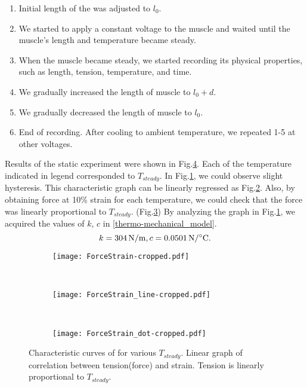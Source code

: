 \begin{enumerate}
\item Initial length of the \scp was adjusted to $l_0$.
\item We started to apply a constant voltage to the muscle and waited until the muscle's length and temperature became steady.
\item When the muscle became steady, we started recording its physical properties, such as length, tension, temperature, and time.
\item We gradually increased the length of muscle to $l_0+d$.
\item We gradually decreased the length of muscle to $l_0$.
\item End of recording. After cooling to ambient temperature, we repeated 1-5 at other voltages.
\end{enumerate}

Results of the static experiment were shown in Fig.\ref{static1_results}. Each of the temperature indicated in legend corresponded to $T_{steady}$. In Fig.\ref{static1_result}, we could observe slight hysteresis. This characteristic graph can be linearly regressed as Fig.\ref{static1_line}. Also, by obtaining force at 10\% strain for each temperature, we could check that the force was linearly proportional to $T_{steady}$. (Fig.\ref{static1_dot}) By analyzing the graph in Fig.\ref{static1_result}, we acquired the values of $k$, $c$ in \eqref{thermo-mechanical_model}.
\begin{equation}
k=\SI{304}{\newton\per\meter}, c=\SI{0.0501}{\newton\per\degreeCelsius}. \notag
\end{equation}

\begin{figure}[t]
	\centering
	\begin{subfigure}[t]{0.32\textwidth}
		\texttt{[image: ForceStrain-cropped.pdf]}
		\caption{\label{static1_result}}
	\end{subfigure}
	~
	\begin{subfigure}[t]{0.32\textwidth}
		\texttt{[image: ForceStrain\_line-cropped.pdf]}
		\caption{\label{static1_line}}
	\end{subfigure}
	~
	\begin{subfigure}[t]{0.32\textwidth}
		\texttt{[image: ForceStrain\_dot-cropped.pdf]}
		\caption{\label{static1_dot}}
	\end{subfigure}
	\caption[Results of static experiment]{ Characteristic curves of \scp for various $T_{steady}$.  Linear graph of correlation between tension(force) and strain.  Tension is linearly proportional to $T_{steady}$.}
	\label{static1_results}
\end{figure}

